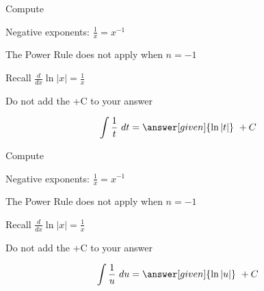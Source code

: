 \documentclass{ximera}
\begin{document}
\begin{problem} %
Compute 

\begin{hint}
Negative exponents: $\frac{1}{x} = x^{-1}$
\end{hint}
\begin{hint}
The Power Rule does not apply when $n = -1$
\end{hint}
\begin{hint}
Recall $\frac{d}{dx} \ln|x| = \frac{1}{x}$
\end{hint}
\begin{hint}
\begin{center}
Do not add the +C to your answer
\end{center}
\end{hint}

\[
\int \frac{1}{t} \ dt =
\answer[given]{\ln|t|} \ + C
\]
\end{problem}

\begin{problem} %
Compute 

\begin{hint}
Negative exponents: $\frac{1}{x} = x^{-1}$
\end{hint}
\begin{hint}
The Power Rule does not apply when $n = -1$
\end{hint}
\begin{hint}
Recall $\frac{d}{dx} \ln|x| = \frac{1}{x}$
\end{hint}
\begin{hint}
\begin{center}
Do not add the +C to your answer
\end{center}
\end{hint}

\[
\int \frac{1}{u} \ du =
\answer[given]{\ln|u|} \ + C
\]
\end{problem}
\end{document}
